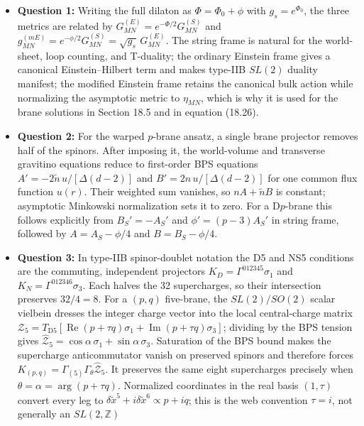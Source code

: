 \documentclass[
  10pt,
  a4paper,
  openany]{book}
\providecommand{\tightlist}{%
  \setlength{\itemsep}{0pt}\setlength{\parskip}{0pt}}
\begin{document}
\begin{itemize}
\tightlist
\item
  \textbf{Question 1:} Writing the full dilaton as \(\Phi=\Phi_0+\phi\)
  with \(g_s=e^{\Phi_0}\), the three metrics are related by
  \(G^{(E)}_{MN}=e^{-\Phi/2}G^{(S)}_{MN}\) and
  \(g^{(mE)}_{MN}=e^{-\phi/2}G^{(S)}_{MN}=\sqrt{g_s}\,G^{(E)}_{MN}\).
  The string frame is natural for the world-sheet, loop counting, and
  T-duality; the ordinary Einstein frame gives a canonical
  Einstein--Hilbert term and makes type-IIB \(SL(2)\) duality manifest;
  the modified Einstein frame retains the canonical bulk action while
  normalizing the asymptotic metric to \(\eta_{MN}\), which is why it is
  used for the brane solutions in Section 18.5 and in equation (18.26).
\item
  \textbf{Question 2:} For the warped \(p\)-brane ansatz, a single brane
  projector removes half of the spinors. After imposing it, the
  world-volume and transverse gravitino equations reduce to first-order
  BPS equations \(A'=-2\tilde n\,u/[\Delta(d-2)]\) and
  \(B'=2n\,u/[\Delta(d-2)]\) for one common flux function \(u(r)\).
  Their weighted sum vanishes, so \(nA+\tilde nB\) is constant;
  asymptotic Minkowski normalization sets it to zero. For a D\(p\)-brane
  this follows explicitly from \(B_S'=-A_S'\) and \(\phi'=(p-3)A_S'\) in
  string frame, followed by \(A=A_S-\phi/4\) and \(B=B_S-\phi/4\).
\item
  \textbf{Question 3:} In type-IIB spinor-doublet notation the D5 and
  NS5 conditions are the commuting, independent projectors
  \(K_D=\Gamma^{012345}\sigma_1\) and \(K_N=\Gamma^{012346}\sigma_3\).
  Each halves the 32 supercharges, so their intersection preserves
  \(32/4=8\). For a \((p,q)\) five-brane, the \(SL(2)/SO(2)\) scalar
  vielbein dresses the integer charge vector into the local
  central-charge matrix
  \(\mathcal Z_5=T_{\mathrm{D5}}[\operatorname{Re}(p+\tau q)\sigma_1+\operatorname{Im}(p+\tau q)\sigma_3]\);
  dividing by the BPS tension gives
  \(\widehat{\mathcal Z}_5=\cos\alpha\,\sigma_1+\sin\alpha\,\sigma_3\).
  Saturation of the BPS bound makes the supercharge anticommutator
  vanish on preserved spinors and therefore forces
  \(K_{(p,q)}=\Gamma_{(5)}\Gamma_\theta\widehat{\mathcal Z}_5\). It
  preserves the same eight supercharges precisely when
  \(\theta=\alpha=\arg(p+\tau q)\). Normalized coordinates in the real
  basis \((1,\tau)\) convert every leg to
  \(\delta\tilde x^5+i\delta\tilde x^6\propto p+iq\); this is the web
  convention \(\tau=i\), not generally an \(SL(2,\mathbb Z)\)

\end{itemize}
\end{document}
